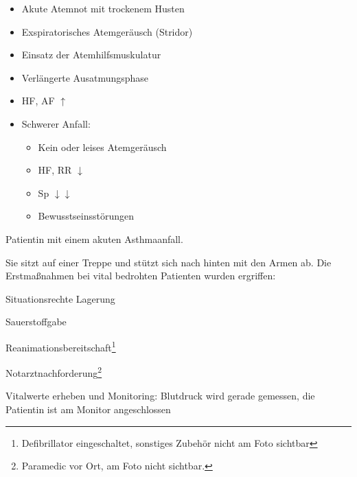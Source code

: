 {{}{
\begin{itemize}
  \item Akute Atemnot mit trockenem Husten
  \item Exspiratorisches Atemgeräusch (Stridor)
  \item Einsatz der Atemhilfsmuskulatur
  \item Verlängerte Ausatmungsphase
  \item HF, AF $\uparrow$
  \item Schwerer Anfall:
  \begin{itemize}
    \item Kein oder leises Atemgeräusch
    \item HF, RR $\downarrow$
    \item Sp $\downarrow\downarrow$
    \item Bewusstseinsstörungen
  \end{itemize}
\end{itemize}
}
{}
{}
{}

% 



{%
Patientin mit einem akuten Asthmaanfall.

Sie sitzt auf einer Treppe und stützt sich nach hinten mit
den Armen ab. Die Erstmaßnahmen bei vital bedrohten
Patienten wurden ergriffen:
\begin{compactitem}
  \item Situationsrechte Lagerung
  \item Sauerstoffgabe
  \item Reanimationsbereitschaft\footnote{Defibrillator eingeschaltet,
  sonstiges Zubehör nicht am Foto sichtbar}
  \item Notarztnachforderung\footnote{Paramedic
  vor Ort, am Foto nicht sichtbar.}
  \item Vitalwerte erheben und Monitoring:
  Blutdruck wird gerade gemessen, die Patientin
  ist am Monitor angeschlossen
\end{compactitem}
}{

}}

